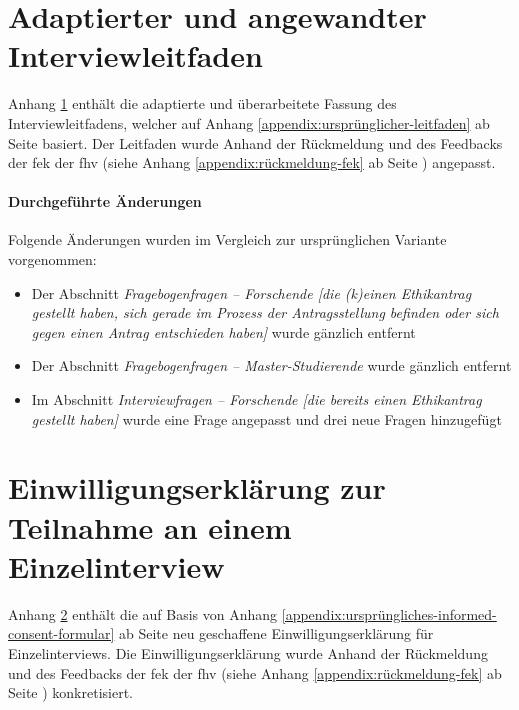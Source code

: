 \documentclass[a4paper,12pt,twoside]{scrreprt}
\begin{document}


\chapter{Adaptierter und angewandter Interviewleitfaden}
\label{appendix:interview-leitfaden}

Anhang \ref{appendix:interview-leitfaden} enthält die adaptierte und überarbeitete Fassung des Interviewleitfadens, welcher auf Anhang \ref{appendix:ursprünglicher-leitfaden} ab Seite \pageref{appendix:ursprünglicher-leitfaden} basiert. Der Leitfaden wurde Anhand der Rückmeldung und des Feedbacks der \acl{fek} der \acl{fhv} (siehe Anhang \ref{appendix:rückmeldung-fek} ab Seite \pageref{appendix:rückmeldung-fek}) angepasst.

\subsubsection*{Durchgeführte Änderungen}
\label{appendix:änderungen-interview-leitfaden}

Folgende Änderungen wurden im Vergleich zur ursprünglichen Variante vorgenommen:
\begin{itemize}
    \item Der Abschnitt \textit{Fragebogenfragen -- Forschende [die (k)einen Ethikantrag gestellt haben, sich gerade im Prozess der Antragsstellung befinden oder sich gegen einen Antrag entschieden haben]} wurde gänzlich entfernt
    \item Der Abschnitt \textit{Fragebogenfragen -- Master-Studierende} wurde gänzlich entfernt
    \item Im Abschnitt \textit{Interviewfragen -- Forschende [die bereits einen Ethikantrag gestellt haben]} wurde eine Frage angepasst und drei neue Fragen hinzugefügt
\end{itemize}



\chapter{Einwilligungserklärung zur Teilnahme an einem Einzelinterview}
\label{appendix:informed-consent-einzelinterview}

Anhang \ref{appendix:informed-consent-einzelinterview} enthält die auf Basis von Anhang \ref{appendix:ursprüngliches-informed-consent-formular} ab Seite \pageref{appendix:ursprüngliches-informed-consent-formular} neu geschaffene Einwilligungserklärung für Einzelinterviews. Die Einwilligungserklärung wurde Anhand der Rückmeldung und des Feedbacks der \acl{fek} der \acl{fhv} (siehe Anhang \ref{appendix:rückmeldung-fek} ab Seite \pageref{appendix:rückmeldung-fek}) konkretisiert.
\end{document}
